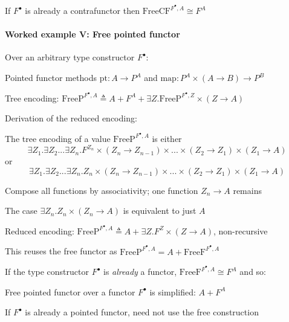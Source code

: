 If $F^{\bullet}$ is already a contrafunctor then $\text{FreeCF}^{F^{\bullet},A}\cong F^{A}$


\paragraph{Worked example V: Free pointed functor}

Over an arbitrary type constructor $F^{\bullet}$:

Pointed functor methods {\footnotesize{}$\text{pt}:A\rightarrow P^{A}$}
and {\footnotesize{}$\text{map}:P^{A}\times\left(A\rightarrow B\right)\rightarrow P^{B}$}{\footnotesize\par}

Tree encoding: {\footnotesize{}$\text{FreeP}^{F^{\bullet},A}\triangleq A+F^{A}+\exists Z.\text{FreeP}^{F^{\bullet},Z}\times\left(Z\rightarrow A\right)$}{\footnotesize\par}

Derivation of the reduced encoding:

The tree encoding of a value $\text{FreeP}^{F^{\bullet},A}$ is either{\footnotesize{}
\[
\exists Z_{1}.\exists Z_{2}...\exists Z_{n}.F^{Z_{n}}\times\left(Z_{n}\rightarrow Z_{n-1}\right)\times...\times\left(Z_{2}\rightarrow Z_{1}\right)\times\left(Z_{1}\rightarrow A\right)
\]
}or{\footnotesize{}
\[
\exists Z_{1}.\exists Z_{2}...\exists Z_{n}.Z_{n}\times\left(Z_{n}\rightarrow Z_{n-1}\right)\times...\times\left(Z_{2}\rightarrow Z_{1}\right)\times\left(Z_{1}\rightarrow A\right)
\]
}{\footnotesize\par}

Compose all functions by associativity; one function $Z_{n}\rightarrow A$
remains

The case $\exists Z_{n}.Z_{n}\times\left(Z_{n}\rightarrow A\right)$
is equivalent to just $A$

Reduced encoding: {\footnotesize{}$\text{FreeP}^{F^{\bullet},A}\triangleq A+\exists Z.F^{Z}\times\left(Z\rightarrow A\right)$,
}non-recursive

This reuses the free functor as $\text{FreeP}^{F^{\bullet},A}=A+\text{FreeF}^{F^{\bullet},A}$

If the type constructor $F^{\bullet}$ is \emph{already} a functor,
$\text{FreeF}^{F^{\bullet},A}\cong F^{A}$ and so:

Free pointed functor over a functor $F^{\bullet}$ is simplified:
$A+F^{A}$

If $F^{\bullet}$ is already a pointed functor, need not use the free
construction

